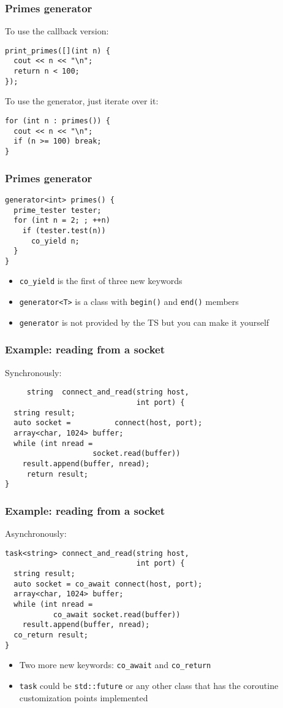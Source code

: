 \documentclass[aspectratio=43]{beamer}
\begin{document}
\begin{frame}[fragile]
  \frametitle{Primes generator}
  To use the callback version:
\begin{lstlisting}
print_primes([](int n) {
  cout << n << "\n";
  return n < 100;
});
\end{lstlisting}
    \pause
  To use the generator, just iterate over it:
\begin{lstlisting}
for (int n : primes()) {
  cout << n << "\n";
  if (n >= 100) break;
}
\end{lstlisting}
\end{frame}

\begin{frame}[fragile]
  \frametitle{Primes generator}
\begin{lstlisting}
generator<int> primes() {
  prime_tester tester;
  for (int n = 2; ; ++n)
    if (tester.test(n))
      co_yield n;
  }
}
\end{lstlisting}
  \begin{itemize}
  \item \lstinline~co_yield~ is the first of three new keywords
  \item \lstinline~generator<T>~ is a class with \lstinline~begin()~ and
    \lstinline~end()~ members
  \item \lstinline~generator~ is not provided by the TS but you can make it
    yourself
  \end{itemize}
\end{frame}

\begin{frame}[fragile,t]
  \frametitle{Example: reading from a socket}
  Synchronously:
\begin{lstlisting}
     string  connect_and_read(string host,
                              int port) {
  string result;
  auto socket =          connect(host, port);
  array<char, 1024> buffer;
  while (int nread =
                    socket.read(buffer))
    result.append(buffer, nread);
     return result;
}
\end{lstlisting}
\end{frame}
\begin{frame}[fragile,t]
  \frametitle{Example: reading from a socket}
  Asynchronously:
\begin{lstlisting}
task<string> connect_and_read(string host,
                              int port) {
  string result;
  auto socket = co_await connect(host, port);
  array<char, 1024> buffer;
  while (int nread =
           co_await socket.read(buffer))
    result.append(buffer, nread);
  co_return result;
}
\end{lstlisting}
  \begin{itemize}
  \item Two more new keywords: \lstinline~co_await~ and \lstinline~co_return~
  \item \lstinline~task~ could be \lstinline~std::future~ or any other class that has the
    coroutine customization points implemented
  \end{itemize}
\end{frame}
\end{document}
